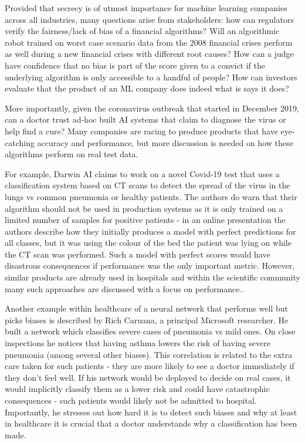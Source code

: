 \documentclass[proposal]{softeng}
\begin{document}
Provided that secrecy is of utmost importance for machine learning companies across all industries, many questions arise from stakeholders: how can regulators verify the fairness/lack of bias of a financial algorithms? Will an algorithmic robot trained on worst case scenario data from the 2008 financial crises perform as well during a new financial crises with different root causes? How can a judge have confidence that no bias is part of the score given to a convict if the underlying algorithm is only accessible to a handful of people? How can investors evaluate that the product of an ML company does indeed what is says it does? 

More importantly, given the coronavirus outbreak that started in December 2019, can a doctor trust ad-hoc built AI systems that claim to diagnose the virus or help find a cure? Many companies are racing to produce products that have eye-catching accuracy and performance, but more discussion is needed on how these algorithms perform on real test data. 

For example, Darwin AI \cite{DarwinAI} claims to work on a novel Covid-19 test that uses a classification system based on CT scans to detect the spread of the virus in the lungs vs common pneumonia or healthy patients\cite{covid-net}. The authors do warn that their algorithm should not be used in production systems as it is only trained on a limited number of samples for positive patients - in an online presentation the authors describe how they initially produces a model with perfect predictions for all classes, but it was using the colour of the bed the patient was lying on while the CT scan was performed. Such a model with perfect scores would have disastrous consequences if performance was the only important metric. However, similar products are already used in hospitals\cite{aids-doctors} and within the scientific community many such approaches are discussed with a focus on performance.\cite{ai-covid-19}.

Another example within healthcare of a neural network that performs well but picks biases is described by Rich Caruana, a principal Microsoft researcher. He built a network which classifies severe cases of pneumonia vs mild ones\cite{rich-caruana}. On close inspections he notices that having asthma lowers the risk of having severe pneumonia (among several other biases). This correlation is related to the extra care taken for such patients - they are more likely to see a doctor immediately if they don't feel well. If his network would be deployed to decide on real cases, it would implicitly classify them as a lower risk and could have catastrophic consequences - such patients would likely not be admitted to hospital. Importantly, he stresses out how hard it is to detect such biases and why at least in healthcare it is crucial that a doctor understands why a classification has been made. 
\end{document}

